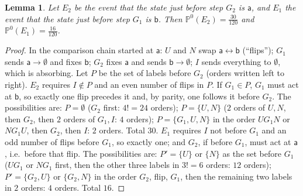 \documentclass[11pt]{article}
\newtheorem{lemma}[theorem]{Lemma}
\theoremstyle{definition}
\renewcommand{\Pr}{\mathbb P}
\newcommand{\sa}{\mathsf a}
\newcommand{\sbb}{\mathsf b}
\begin{document}
\begin{lemma}\label{lem:count}
Let $E_2$ be the event that the state just before step $G_2$ is $\sa$, and $E_1$ the event that the state just before step $G_1$ is $\sbb$. Then $\Pr^0(E_2)=\frac{30}{120}$ and $\Pr^0(E_1)=\frac{16}{120}$.
\end{lemma}
\begin{proof}
In the comparison chain started at $\sa$: $U$ and $N$ swap $\sa\leftrightarrow\sbb$ (``flips''); $G_1$ sends $\sa\to\emptyset$ and fixes $\sbb$; $G_2$ fixes $\sa$ and sends $\sbb\to\emptyset$; $I$ sends everything to $\emptyset$, which is absorbing. Let $P$ be the set of labels before $G_2$ (orders written left to right).
$E_2$ requires $I\notin P$ and an even number of flips in $P$. If $G_1\in P$, $G_1$ must act at $\sbb$, so exactly one flip precedes it and, by parity, one follows it before $G_2$. The possibilities are: $P=\emptyset$ ($G_2$ first: $4!=24$ orders); $P=\{U,N\}$ ($2$ orders of $U,N$, then $G_2$, then $2$ orders of $G_1,I$: $4$ orders); $P=\{G_1,U,N\}$ in the order $UG_1N$ or $NG_1U$, then $G_2$, then $I$: $2$ orders. Total $30$.
$E_1$ requires $I$ not before $G_1$ and an odd number of flips before $G_1$, so exactly one; and $G_2$, if before $G_1$, must act at $\sa$, i.e.\ before that flip. The possibilities are: $P'=\{U\}$ or $\{N\}$ as the set before $G_1$ ($U G_1$ or $N G_1$ first, then the other three labels in $3!=6$ orders: $12$ orders); $P'=\{G_2,U\}$ or $\{G_2,N\}$ in the order $G_2$, flip, $G_1$, then the remaining two labels in $2$ orders: $4$ orders. Total $16$.
\end{proof}
\end{document}
